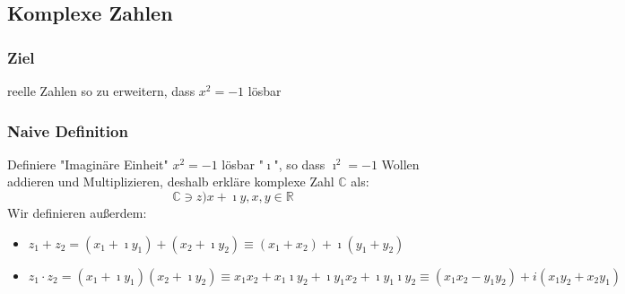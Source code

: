 \documentclass[a4paper]{scrartcl}
\theoremstyle{definition}
\theoremstyle{plain}
\theoremstyle{remark}
\newcommand{\I}{\ensuremath{\imath}}%
\begin{document}
\subsection{Komplexe Zahlen}
\label{sec-5-1}
\subsubsection{Ziel}
\label{sec-5-1-1}
reelle Zahlen so zu erweitern, dass $x^2 = - 1$ lösbar
\subsubsection{Naive Definition}
\label{sec-5-1-2}
Definiere "Imaginäre Einheit" $x^2 = -1$ lösbar "$\I$", so dass $\I^2 = -1$
Wollen addieren und Multiplizieren, deshalb erkläre komplexe Zahl $\mathbb{C}$ als:
\[\mathbb{C} \ni z ) x + \I y, x,y\in\mathbb{R}\]
Wir definieren außerdem:
\begin{itemize}
\item $z_1 + z_2 = (x_1 + \I y_1) + (x_2 + \I y_2) \equiv (x_1 + x_2) + \I(y_1 + y_2)$
\item $z_1 \cdot z_2 = (x_1 + \I y_1) (x_2 + \I y_2) \equiv x_1 x_2 + x_1 \I y_2 + \I y_1 x_2 + \I y_1 \I y_2 \equiv (x_1 x_2 - y_1 y_2) + i(x_1 y_2 + x_2 y_1)$
\end{itemize}
\end{document}
